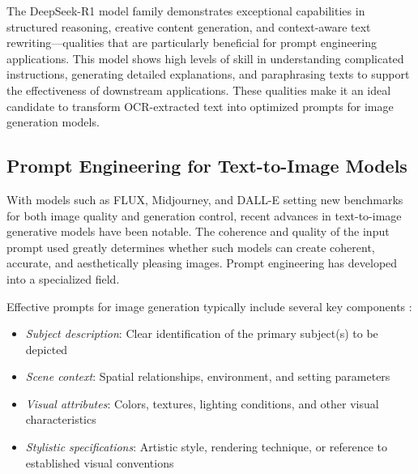 The DeepSeek-R1 model family demonstrates exceptional capabilities in structured reasoning, creative content generation, and context-aware text rewriting—qualities that are particularly beneficial for prompt engineering applications. This model shows high levels of skill in understanding complicated instructions, generating detailed explanations, and paraphrasing texts to support the effectiveness of downstream applications. These qualities make it an ideal candidate to transform OCR-extracted text into optimized prompts for image generation models.

\subsection{Prompt Engineering for Text-to-Image Models}
\label{subsec:prompt-engineering}

With models such as FLUX, Midjourney, and DALL-E setting new benchmarks for both image quality and generation control, recent advances in text-to-image generative models have been notable. The coherence and quality of the input prompt used greatly determines whether such models can create coherent, accurate, and aesthetically pleasing images. Prompt engineering has developed into a specialized field.


Effective prompts for image generation typically include several key components \cite{oppenlaender2022creativity}:

\begin{itemize}
    \item \textit{Subject description}: Clear identification of the primary subject(s) to be depicted
\end{itemize}

\begin{itemize}
    \item \textit{Scene context}: Spatial relationships, environment, and setting parameters
\end{itemize}

\begin{itemize}
    \item \textit{Visual attributes}: Colors, textures, lighting conditions, and other visual characteristics
\end{itemize}

\begin{itemize}
    \item \textit{Stylistic specifications}: Artistic style, rendering technique, or reference to established visual conventions
\end{itemize}

